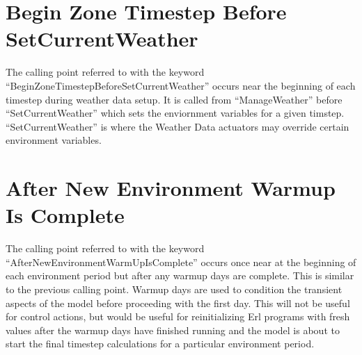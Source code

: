 \section{Begin Zone Timestep Before SetCurrentWeather}\label{begin-zone-timestep-before-setcurrentweather}

The calling point referred to with the keyword ``BeginZoneTimestepBeforeSetCurrentWeather'' occurs near the beginning of each timestep during weather data setup. It is called from ``ManageWeather'' before ``SetCurrentWeather'' which sets the enviornment variables for a given timstep. ``SetCurrentWeather'' is where the Weather Data actuators may override certain environment variables.

\section{After New Environment Warmup Is Complete}\label{after-new-environment-warmup-is-complete}

The calling point referred to with the keyword ``AfterNewEnvironmentWarmUpIsComplete'' occurs once near at the beginning of each environment period but after any warmup days are complete. This is similar to the previous calling point. Warmup days are used to condition the transient aspects of the model before proceeding with the first day. This will not be useful for control actions, but would be useful for reinitializing Erl programs with fresh values after the warmup days have finished running and the model is about to start the final timestep calculations for a particular environment period.
